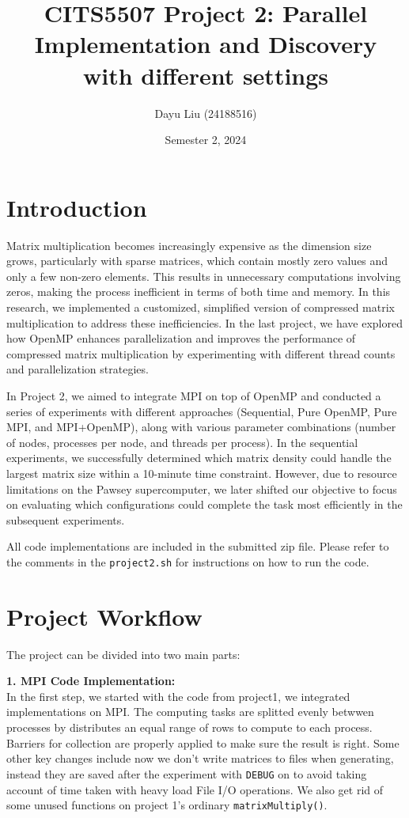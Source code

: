 \documentclass[
]{article}
\title{CITS5507 Project 2: Parallel Implementation and Discovery with
different settings}
\author{Dayu Liu (24188516)}
\date{Semester 2, 2024}
\begin{document}
\maketitle

\section{Introduction}\label{introduction}

Matrix multiplication becomes increasingly expensive as the dimension
size grows, particularly with sparse matrices, which contain mostly zero
values and only a few non-zero elements. This results in unnecessary
computations involving zeros, making the process inefficient in terms of
both time and memory. In this research, we implemented a customized,
simplified version of compressed matrix multiplication to address these
inefficiencies. In the last project, we have explored how OpenMP
enhances parallelization and improves the performance of compressed
matrix multiplication by experimenting with different thread counts and
parallelization strategies.

In Project 2, we aimed to integrate MPI on top of OpenMP and conducted a
series of experiments with different approaches (Sequential, Pure
OpenMP, Pure MPI, and MPI+OpenMP), along with various parameter
combinations (number of nodes, processes per node, and threads per
process). In the sequential experiments, we successfully determined
which matrix density could handle the largest matrix size within a
10-minute time constraint. However, due to resource limitations on the
Pawsey supercomputer, we later shifted our objective to focus on
evaluating which configurations could complete the task most efficiently
in the subsequent experiments.

All code implementations are included in the submitted zip file. Please
refer to the comments in the \texttt{project2.sh} for instructions on
how to run the code. \vspace{0.5cm}

\section{Project Workflow}\label{project-workflow}

The project can be divided into two main parts:

\textbf{1. MPI Code Implementation:}\\
In the first step, we started with the code from project1, we integrated
implementations on MPI. The computing tasks are splitted evenly betwwen
processes by distributes an equal range of rows to compute to each
process. Barriers for collection are properly applied to make sure the
result is right. Some other key changes include now we don't write
matrices to files when generating, instead they are saved after the
experiment with \texttt{DEBUG} on to avoid taking account of time taken
with heavy load File I/O operations. We also get rid of some unused
functions on project 1's ordinary \texttt{matrixMultiply()}.
\end{document}
